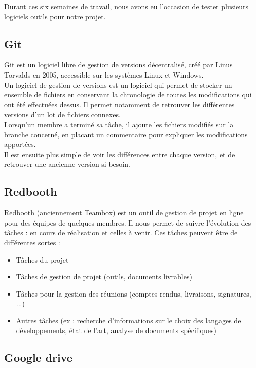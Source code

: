 Durant ces six semaines de travail, nous avons eu l'occasion de tester plusieurs logiciels outils pour notre projet.

\subsection{Git}

Git est un logiciel libre de gestion de versions décentralisé, créé par Linus Torvalds en 2005, accessible sur les systèmes Linux et Windows.\\
Un logiciel de gestion de versions est un logiciel qui permet de stocker un ensemble de fichiers en conservant la chronologie de toutes les modifications qui ont été effectuées dessus. Il permet notamment de retrouver les différentes versions d’un lot de fichiers connexes.\\
Lorsqu'un membre a terminé sa tâche, il ajoute les fichiers modifiés sur la branche concerné, en placant un commentaire pour expliquer les modifications apportées.\\
Il est ensuite plus simple de voir les différences entre chaque version, et de retrouver une ancienne version si besoin.\\

\subsection{Redbooth}

Redbooth (anciennement Teambox) est un outil de gestion de projet en ligne pour des équipes de quelques membres. Il nous permet de suivre l'évolution des tâches : en cours de réalisation et celles à venir. Ces tâches peuvent être de différentes sortes :
\begin{itemize}
\item Tâches du projet
\item Tâches de gestion de projet (outils, documents livrables)
\item Tâches pour la gestion des réunions (comptes-rendus, livraisons, signatures, ...)
\item Autres tâches (ex : recherche d'informations sur le choix des langages de développements, état de l'art, analyse de documents spécifiques)
\end{itemize}

\subsection{Google drive}

